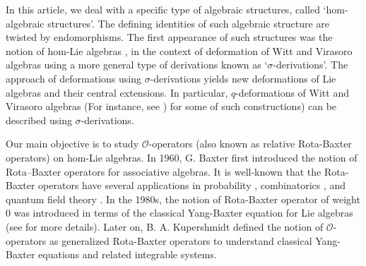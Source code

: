 \documentclass[a4paper,11pt]{amsart}
\theoremstyle{plain}
\theoremstyle{definition}
\theoremstyle{remark}
\numberwithin{equation}{section}
\begin{document}


In this article, we deal with a specific type of algebraic structures, called `hom-algebraic structures'. The defining identities of such algebraic structure are twisted by endomorphisms. The first appearance of such structures was the notion of hom-Lie algebras \cite{HLIE01}, in the context of deformation of Witt and Virasoro algebras using a more general type of derivations known as `$\sigma$-derivations'. The approach of deformations using $\sigma$-derivations yields new deformations of Lie algebras and their central extensions. In particular, $q$-deformations of Witt and Virasoro algebras (For instance, see  \cite{q1,q3,q4,q5,q2,QuasiHL1,q7,q8, q9, q10}) for some of such constructions) can be described using $\sigma$-derivations. 

Our main objective is to study $\mathcal{O}$-operators (also known as relative Rota-Baxter operators) on hom-Lie algebras. In 1960, G. Baxter \cite{Baxter} first introduced the notion of Rota–Baxter operators for associative algebras. It is well-known that the Rota-Baxter operators have several applications in probability \cite{Baxter}, combinatorics \cite{Cartier, Guo, Rota}, and quantum field theory \cite{Connes}. In the 1980s, the notion of Rota-Baxter operator of weight $0$ was introduced in terms of the classical Yang-Baxter equation for Lie algebras (see \cite{Survey-Guo} for more details). Later on, B. A. Kupershmidt \cite{Kupershmidt} defined the notion of $\mathcal{O}$-operators as generalized Rota-Baxter operators to understand classical Yang-Baxter equations and related integrable systems.  
\end{document}
